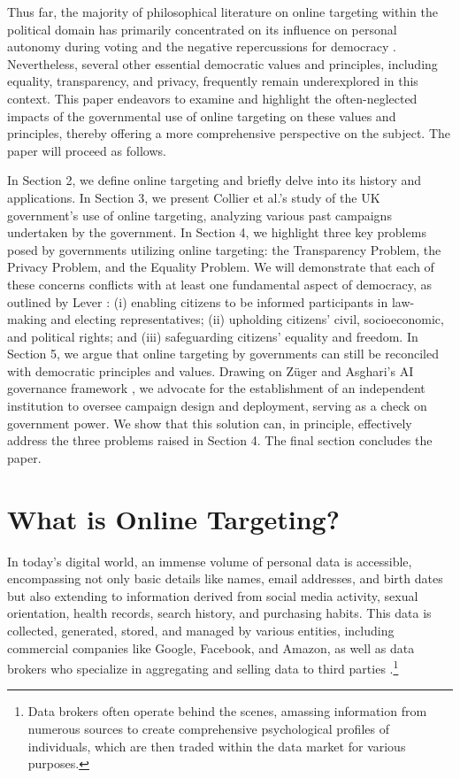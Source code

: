 \documentclass[preprint]{acmart}
\begin{document}
Thus far, the majority of philosophical literature on online targeting within the political domain has primarily concentrated on its influence on personal autonomy during voting and the negative repercussions for democracy \cite{Susserand2019, Susser20192, zuiderveen2018, barnhill}. Nevertheless, several other essential democratic values and principles, including equality, transparency, and privacy, frequently remain underexplored in this context. This paper endeavors to examine and highlight the often-neglected impacts of the governmental use of online targeting on these values and principles, thereby offering a more comprehensive perspective on the subject. The paper will proceed as follows.

In Section 2, we define online targeting and briefly delve into its history and applications. In Section 3, we present Collier et al.'s study \cite{Collier2022} of the UK government's use of online targeting, analyzing various past campaigns undertaken by the government. In Section 4, we highlight three key problems posed by governments utilizing online targeting: the Transparency Problem, the Privacy Problem, and the Equality Problem. We will demonstrate that each of these concerns conflicts with at least one fundamental aspect of democracy, as outlined by Lever \cite{lever2006}: (i) enabling citizens to be informed participants in law-making and electing representatives; (ii) upholding citizens' civil, socioeconomic, and political rights; and (iii) safeguarding citizens' equality and freedom. In Section 5, we argue that online targeting by governments can still be reconciled with democratic principles and values. Drawing on Züger and Asghari's AI governance framework \cite{zuger2022}, we advocate for the establishment of an independent institution to oversee campaign design and deployment, serving as a check on government power. We show that this solution can, in principle, effectively address the three problems raised in Section 4. The final section concludes the paper. 



\section{What is Online Targeting?}

In today's digital world, an immense volume of personal data is accessible, encompassing not only basic details like names, email addresses, and birth dates but also extending to information derived from social media activity, sexual orientation, health records, search history, and purchasing habits. This data is collected, generated, stored, and managed by various entities, including commercial companies like Google, Facebook, and Amazon, as well as data brokers who specialize in aggregating and selling data to third parties \cite{anthes2015,Crain2018}.\footnote{Data brokers often operate behind the scenes, amassing information from numerous sources to create comprehensive psychological profiles of individuals, which are then traded within the data market for various purposes.}
\end{document}
